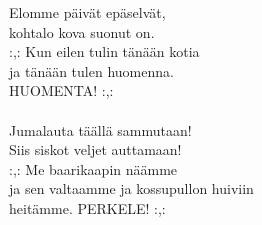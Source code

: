 
Elomme päivät epäselvät, \\ kohtalo kova suonut on. \\ :,: Kun eilen tulin tänään kotia \\ ja tänään tulen huomenna. \\ HUOMENTA! :,: \\ \hspace{10mm} \\ Jumalauta täällä sammutaan! \\ Siis siskot veljet auttamaan! \\ 
:,: Me baarikaapin näämme \\ ja sen valtaamme ja kossupullon huiviin \\ heitämme. PERKELE! :,:
